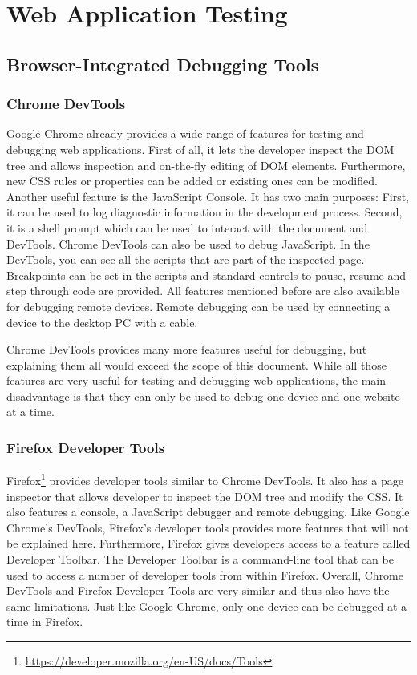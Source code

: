 \section{Web Application Testing}

\subsection{Browser-Integrated Debugging Tools}

\subsubsection{Chrome DevTools}

Google Chrome already provides a wide range of features for testing and debugging web applications. First of all, it lets the developer inspect the DOM tree  and allows inspection and on-the-fly editing of DOM elements. Furthermore, new CSS rules or properties can be added or existing ones can be modified. Another useful feature is the JavaScript Console. It has two main purposes: First, it can be used to log diagnostic information in the development process. Second, it is a shell prompt which can be used to interact with the document and DevTools. Chrome DevTools can also be used to debug JavaScript. In the DevTools, you can see all the scripts that are part of the inspected page. Breakpoints can be set in the scripts and standard controls to pause, resume and step through code are provided. All features mentioned before are also available for debugging remote devices. Remote debugging can be used by connecting a device to the desktop PC with a cable.

Chrome DevTools provides many more features useful for debugging, but explaining them all would exceed the scope of this document. While all those features are very useful for testing and debugging web applications, the main disadvantage is that they can only be used to debug one device and one website at a time.

\subsubsection{Firefox Developer Tools}

Firefox\footnote{\url{https://developer.mozilla.org/en-US/docs/Tools}} provides developer tools similar to Chrome DevTools. It also has a page inspector that allows developer to inspect the DOM tree and modify the CSS. It also features a console, a JavaScript debugger and remote debugging. Like Google Chrome's DevTools, Firefox's developer tools provides more features that will not be explained here. Furthermore, Firefox gives developers access to a feature called Developer Toolbar. The Developer Toolbar is a command-line tool that can be used to access a number of developer tools from within Firefox. Overall, Chrome DevTools and Firefox Developer Tools are very similar and thus also have the same limitations. Just like Google Chrome, only one device can be debugged at a time in Firefox.

